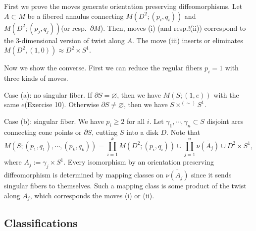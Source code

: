 \documentclass{../../small}
\begin{document}
\begin{pf}
First we prove the moves generate orientation preserving diffeomorphisms.
Let $A\subset M$ be a fibered annulus connecting $M(D^2;(p_i,q_i))$ and $M(D^2;(p_j,q_j))$(or resp.~$\partial M$).
Then, moves (i) (and resp.!(ii)) correspond to the 3-dimensional version of twist along $A$.
The move (iii) inserts or eliminates $M(D^2,(1,0))\approx D^2\times S^1$.

Now we show the converse.
First we can reduce the regular fibers $p_i=1$ with three kinds of moves.

Case (a): no singular fiber.
If $\partial S=\varnothing$, then we have $M(S;(1,e))$ with the same $e$(Exercise 10).
Otherwise $\partial S\ne\varnothing$, then we have $S\times^{(\sim)}S^1$.

Case (b): singular fiber.
We have $p_i\ge2$ for all $i$.
Let $\gamma_1,\cdots,\gamma_n\subset S$ disjoint arcs connecting cone points or $\partial S$, cutting $S$ into a disk $D$.
Note that
\[M(S;(p_1,q_1),\cdots,(p_k,q_k))=\coprod_{i=1}^kM(D^2;(p_i,q_i))\cup\coprod_{j=1}^n\bar{\nu(A_j)}\cup D^2\times S^1,\]
where $A_j:=\gamma_j\times S^1$.
Every isomorphism by an orientation preserving diffeomorphism is determined by mapping classes on $\bar{\nu(A_j)}$ since it sends singular fibers to themselves.
Such a mapping class is some product of the twist along $A_j$, which corresponds the moves (i) or (ii).
\end{pf}

\subsection{Classifications}
\end{document}
